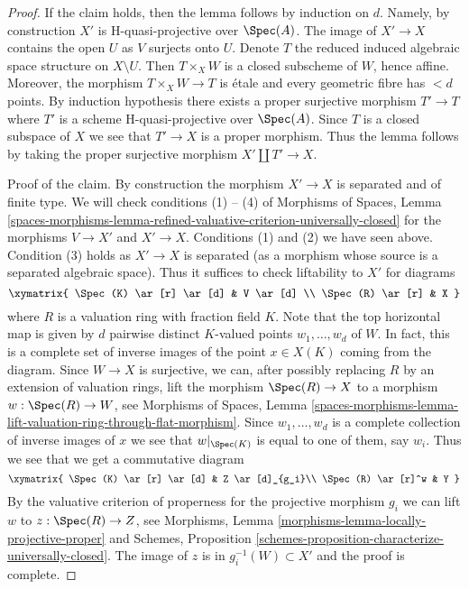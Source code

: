 \begin{proof}
\medskip\noindent
If the claim holds, then the lemma follows by induction on $d$.
Namely, by construction $X'$ is H-quasi-projective over $\Spec(A)$.
The image of $X' \to X$ contains the open $U$ as $V$ surjects onto $U$.
Denote $T$ the reduced induced algebraic space structure on $X \setminus U$.
Then $T \times_X W$ is a closed subscheme of $W$, hence affine.
Moreover, the morphism $T \times_X W \to T$ is \'etale and every geometric
fibre has $< d$ points. By induction hypothesis there exists a proper
surjective morphism $T' \to T$ where $T'$ is a scheme H-quasi-projective
over $\Spec(A)$. Since $T$ is a closed subspace of $X$ we see that
$T' \to X$ is a proper morphism. Thus the lemma follows by taking the
proper surjective morphism $X' \amalg T' \to X$.

\medskip\noindent
Proof of the claim. By construction the morphism $X' \to X$ is separated
and of finite type. We will check conditions (1) -- (4) of
Morphisms of Spaces, Lemma
\ref{spaces-morphisms-lemma-refined-valuative-criterion-universally-closed}
for the morphisms $V \to X'$ and $X' \to X$.
Conditions (1) and (2) we have seen above.
Condition (3) holds as $X' \to X$ is separated (as a morphism whose
source is a separated algebraic space). Thus it suffices to check
liftability to $X'$ for diagrams
$$
\xymatrix{
\Spec(K) \ar[r] \ar[d] & V \ar[d] \\
\Spec(R) \ar[r] & X
}
$$
where $R$ is a valuation ring with fraction field $K$.
Note that the top horizontal map is given by $d$ pairwise distinct
$K$-valued points $w_1, \ldots, w_d$ of $W$. In fact, this
is a complete set of inverse images of the point $x \in X(K)$
coming from the diagram. Since $W \to X$ is surjective,
we can, after possibly replacing $R$ by an extension of valuation rings,
lift the morphism $\Spec(R) \to X$ to a morphism $w : \Spec(R) \to W$, see
Morphisms of Spaces, Lemma
\ref{spaces-morphisms-lemma-lift-valuation-ring-through-flat-morphism}.
Since $w_1, \ldots, w_d$ is a complete collection of inverse images of
$x$ we see that $w|_{\Spec(K)}$ is equal to one of them, say $w_i$.
Thus we see that we get a commutative diagram
$$
\xymatrix{
\Spec(K) \ar[r] \ar[d] &  Z \ar[d]_{g_i}\\
\Spec(R) \ar[r]^w & Y
}
$$
By the valuative criterion of properness for the projective
morphism $g_i$ we can lift $w$ to $z : \Spec(R) \to Z$, see
Morphisms, Lemma \ref{morphisms-lemma-locally-projective-proper}
and
Schemes, Proposition \ref{schemes-proposition-characterize-universally-closed}.
The image of $z$ is in $g_i^{-1}(W) \subset X'$ and the proof is complete.
\end{proof}







